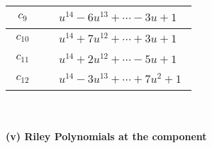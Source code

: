 \documentclass[1p]{elsarticle_modified}
\theoremstyle{definition}
\begin{document}
\begin{tabular}{m{50pt}|m{274pt}}
\hline $$\begin{aligned}c_{9}\end{aligned}$$&$\begin{aligned}
&u^{14}-6 u^{13}+\cdots-3 u+1
\end{aligned}$\\
\hline $$\begin{aligned}c_{10}\end{aligned}$$&$\begin{aligned}
&u^{14}+7 u^{12}+\cdots+3 u+1
\end{aligned}$\\
\hline $$\begin{aligned}c_{11}\end{aligned}$$&$\begin{aligned}
&u^{14}+2 u^{12}+\cdots-5 u+1
\end{aligned}$\\
\hline $$\begin{aligned}c_{12}\end{aligned}$$&$\begin{aligned}
&u^{14}-3 u^{13}+\cdots+7 u^2+1
\end{aligned}$\\
\hline
\end{tabular}\\~\\
\newpage\renewcommand{\arraystretch}{1}
\flushleft \textbf{(v) Riley Polynomials at the component}\newline \\
\end{document}
